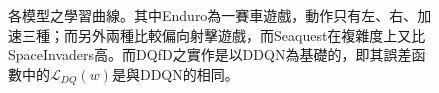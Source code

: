 \documentclass{article}
\begin{document}
\begin{figure}
\caption{各模型之學習曲線。其中Enduro為一賽車遊戲，動作只有左、右、加速三種；而另外兩種比較偏向射擊遊戲，而Seaquest在複雜度上又比SpaceInvaders高。而DQfD之實作是以DDQN為基礎的，即其誤差函數中的$\mathcal{L}_{DQ}(w)$是與DDQN的相同。}
\label{fig:results}
\end{figure}




\renewcommand\refname{參考文獻}


\end{document}
